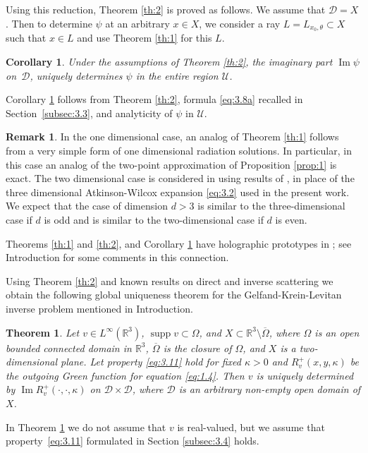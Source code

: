 \documentclass[JEP,XML,SOM,Unicode,NoEqCountersInSection,published]{cedram}
\DeclareMathOperator{\supp}{supp}
\newcommand{\RR}{\mathbb R}
\renewcommand{\Im}{\mathop{\mathrm{Im}}}
\newtheorem{theorem}{Theorem}
\newtheorem{corollary}{Corollary}
\theoremstyle{definition}
\newtheorem{remark}{Remark}
\begin{document}
Using this reduction, Theorem \ref{th:2} is proved as follows.
We assume that $\mathcal{D}=X$.
Then to determine $\psi$ at an arbitrary $x\in X$, we consider a ray $L=L_{x_0, \theta}\subset X$ such that $x\in L$ and use Theorem \ref{th:1} for this $L$.

\begin{corollary}\label{cor:1}
Under the assumptions of Theorem \ref{th:2}, the imaginary part $\Im\psi$ on~$\mathcal{D}$, uniquely determines $\psi$
in the entire region $\mathcal{U}$.
\end{corollary}

Corollary \ref{cor:1} follows from Theorem \ref{th:2}, formula \eqref{eq:3.8a} recalled in Section~\ref{subsec:3.3}, and analyticity of $\psi$ in $\mathcal{U}$.

\begin{remark}\label{rem:1}
In the one dimensional case, an analog of Theorem \ref{th:1} follows from a very simple form of one dimensional radiation solutions.
In particular, in this case an analog of the two-point approximation of Proposition \ref{prop:1} is exact.
The two dimensional case is considered in \cite{NN2} using results of \cite{K}, \cite{NN1} in place of the three dimensional Atkinson-Wilcox expansion \eqref{eq:3.2} used in the present work.
We expect that the case of dimension $d>3$ is similar to the three-dimensional case if $d$ is odd and is similar to the two-dimensional case if $d$ is even.
\end{remark}

Theorems \ref{th:1} and \ref{th:2}, and Corollary \ref{cor:1} have holographic prototypes in \cite{N5}; see Introduction for some comments in this connection.

Using Theorem \ref{th:2} and known results on direct and inverse scattering we obtain the following global uniqueness theorem for the Gelfand-Krein-Levitan inverse problem mentioned in Introduction.

\begin{theorem}\label{th:3}
Let $v \in L^{\infty}(\RR^3)$, $\supp v \subset \Omega$, and $X \subset \RR^3 \setminus \overline {\Omega}$, where $\Omega$ is an open bounded connected domain in $\RR^3$, $\overline {\Omega}$ is the closure of $\Omega$,
and $X$ is a two-dimensional plane. Let property \eqref{eq:3.11} hold for fixed $\kappa>0$ and $R_v^+(x, y, \kappa)$ be the outgoing Green function for equation \eqref{eq:1.4}.
Then $v$ is uniquely determined by $\Im R_v^+(\cdot, \cdot, \kappa)$ on $\mathcal{D} \times \mathcal{D}$,
where $\mathcal{D}$ is an arbitrary non-empty open domain of $X$.
\end{theorem}
In Theorem \ref{th:3} we do not assume that $v$ is real-valued,
but we assume that property~\eqref{eq:3.11} formulated in Section \ref{subsec:3.4} holds.
\end{document}
